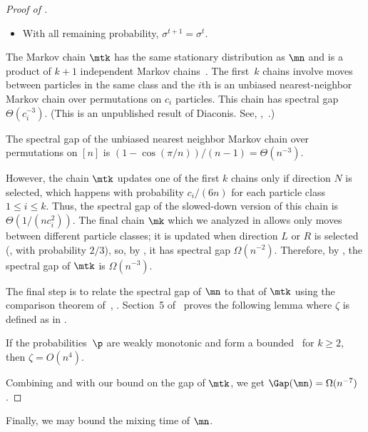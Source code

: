 \begin{proof}[Proof of ]
\begin{itemize}
\item With all remaining probability, $\sigma^{t+1} = \sigma^t.$
\end{itemize}

The Markov chain $\mtk$ has the same
stationary distribution as $\mn$ and is a product of
$k+1$ independent Markov chains~\cite{MS}.  The first~$k$ chains involve moves
between particles in the same class and the $i$th is an unbiased
nearest-neighbor Markov chain over permutations on $c_i$ particles.
%
%
%
This chain has spectral gap $\Theta(c_i^{-3})$. (This is an 
unpublished result of Diaconis. See, \eg,~\cite{wilson}.)    %
\begin{lemma}[Diaconis]
The spectral gap of the unbiased nearest neighbor Markov chain
over permutations on $[n]$ is $(1-\cos(\pi/n))/(n-1)=\Theta(n^{-3})$.
\end{lemma}
\noindent However, the chain $\mtk$ updates one of the first $k$ chains
only if direction $N$ is selected,  which happens with probability $c_i/(6n)$
for each particle class $1\leq i \leq k.$  Thus, the spectral gap of
the slowed-down version of this chain is $\Theta(1/(nc_i^2))$.
The final chain $\mk$ which we analyzed in 
allows only moves between different particle classes; it is updated when
direction $L$ or $R$ is selected (\ie,  with probability $2/3$),
so,  %
by
, it has spectral gap  $\Omega(n^{-2})$.
Therefore, by , the spectral gap of $\mtk$
is $\Omega(n^{-3})$.

The final step is to relate the spectral gap of $\mn$ to that of $\mtk$
using the comparison theorem of~\cite{dsc}, .  
Section~5 of~\cite{MS} proves the following lemma where $\zeta$ is 
defined as in .

\begin{lemma}[\cite{MS}]\label{lem_comp} If the probabilities~$\p$ are
  weakly monotonic and form a bounded \kP\, for $k\geq 2$, then $\zeta=O(n^4)$.
\end{lemma}

\noindent Combining  and 
with our bound on the gap of $\mtk$, we get $\Gap(\mn)=\Omega(n^{-7})$. 
%
\end{proof}

\vspace{.2in}

Finally, we may bound the mixing time of $\mn$. 

